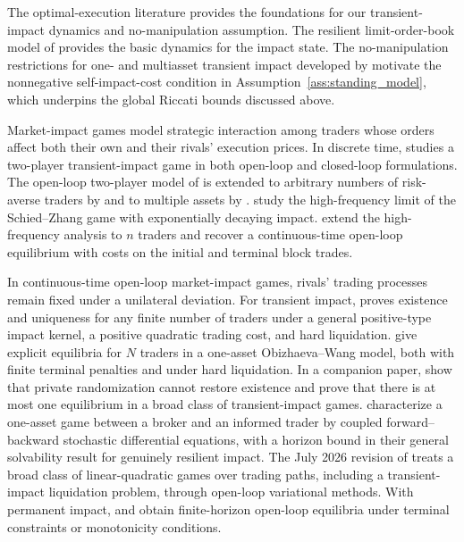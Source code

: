 \documentclass[12pt]{article}
\numberwithin{equation}{section}
\theoremstyle{definition}
\begin{document}
The optimal-execution literature provides the foundations for our
transient-impact dynamics and no-manipulation assumption.
The resilient limit-order-book model of \citet{OBIZHAEVA20131} provides the
basic dynamics for the impact state. The no-manipulation restrictions for one- and multiasset
transient impact developed by
\citet{gatheral_2012,alfonsi2016,Schneider02012019,jaber2026} motivate the
nonnegative self-impact-cost condition in Assumption~\ref{ass:standing_model},
which underpins the global Riccati bounds discussed above.

Market-impact games model strategic interaction among traders whose orders
affect both their own and their rivals' execution prices.
In discrete time, \citet[Chapter~9]{schoeneborn2008trade} studies a
two-player transient-impact game in both open-loop and closed-loop
formulations. The open-loop two-player model of \citet{schied_zhang_2019}
is extended to arbitrary numbers of risk-averse traders by
\citet{luo_schied_2019} and to multiple assets by \citet{CordoniLillo2024}.
\citet{schied_strehle_zhang_2017} study the high-frequency limit of the
Schied--Zhang game with exponentially decaying impact. \citet{NutzProsperi2025}
extend the high-frequency analysis to \(n\) traders and recover a
continuous-time open-loop equilibrium with costs on the initial and terminal
block trades.

In continuous-time open-loop market-impact games, rivals' trading processes
remain fixed under a unilateral deviation. For transient impact, \citet{strehle_2017}
proves existence and uniqueness for any finite number of traders under a
general positive-type impact kernel, a positive quadratic trading cost, and
hard liquidation.
\citet{campbell2026optimalexecutionntraders} give explicit equilibria for
\(N\) traders in a one-asset Obizhaeva--Wang model, both with finite terminal
penalties and under hard liquidation.
In a companion paper, \citet{CampbellNutzRandomization} show that private randomization cannot
restore existence and prove that there is at most one equilibrium in a broad
class of transient-impact games.
\citet{CarteaJaimungalSanchezBetancourt2026} characterize a one-asset game
between a broker and an informed trader by coupled forward--backward stochastic
differential equations, with a horizon bound in their general solvability
result for genuinely resilient impact. The July 2026 revision of
\citet{AbiJaberNeumanVoss2023} treats a broad class of linear-quadratic
games over trading paths, including a transient-impact liquidation problem,
through open-loop variational methods. With permanent impact,
\citet{schied_zhang_2017} and \citet{DrapeauLuoSchiedXiong2021} obtain
finite-horizon open-loop equilibria under terminal constraints or monotonicity
conditions.
\end{document}
